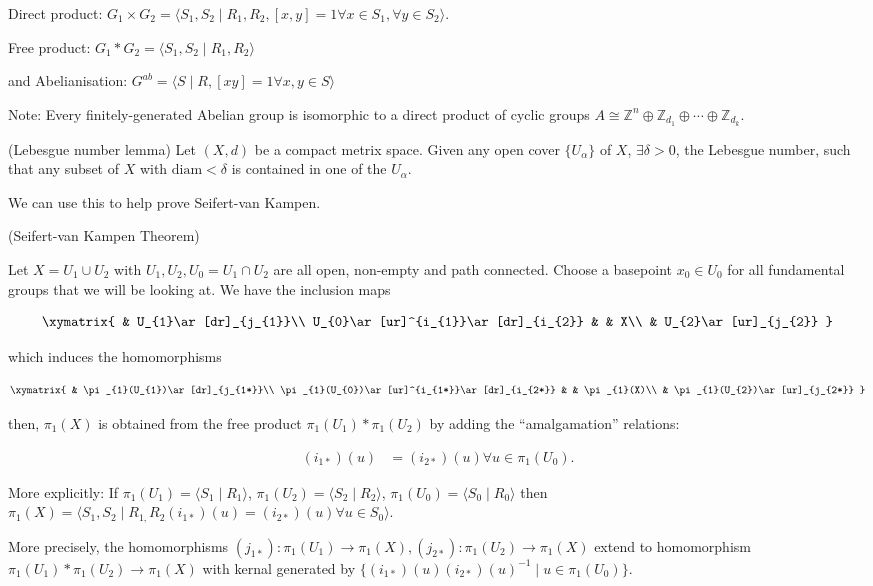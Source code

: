 Direct product: $G_{1}\times G_{2}=\langle S_{1},S_{2}\mid R_{1},R_{2},[x,y]=1\forall x\in S_{1},\forall y\in S_{2}\rangle.$

Free product: $G_{1}*G_{2}=\langle S_{1},S_{2}\mid R_{1},R_{2}\rangle$

and Abelianisation: $G^{ab}=\langle S\mid R,[xy]=1\forall x,y\in S\rangle$

Note: Every finitely-generated Abelian group is isomorphic to a direct
product of cyclic groups $A\cong\mathbb{Z}^{n}\oplus\mathbb{Z}_{d_{1}}\oplus\cdots\oplus\mathbb{Z}_{d_{k}}.$
\begin{lem}
(Lebesgue number lemma) Let $(X,d)$ be a compact metrix space. Given
any open cover $\{U_{\alpha}\}$ of $X$, $\exists\delta>0$, the
Lebesgue number, such that any subset of $X$ with $\text{diam}<\delta$
is contained in one of the $U_{\alpha}$.
\end{lem}
We can use this to help prove Seifert-van Kampen.
\begin{thm}
(Seifert-van Kampen Theorem)

Let $X=U_{1}\cup U_{2}$ with $U_{1},U_{2},U_{0}=U_{1}\cap U_{2}$
are all open, non-empty and path connected. Choose a basepoint $x_{0}\in U_{0}$
for all fundamental groups that we will be looking at. We have the
inclusion maps

\begin{align*}
\xymatrix{ & U_{1}\ar[dr]_{j_{1}}\\
U_{0}\ar[ur]^{i_{1}}\ar[dr]_{i_{2}} &  & X\\
 & U_{2}\ar[ur]_{j_{2}}
}
\end{align*}


which induces the homomorphisms

\begin{align*}
\xymatrix{ & \pi_{1}(U_{1})\ar[dr]_{j_{1*}}\\
\pi_{1}(U_{0})\ar[ur]^{i_{1*}}\ar[dr]_{i_{2*}} &  & \pi_{1}(X)\\
 & \pi_{1}(U_{2})\ar[ur]_{j_{2*}}
}
\end{align*}


then, $\pi_{1}(X)$ is obtained from the free product $\pi_{1}(U_{1})*\pi_{1}(U_{2})$
by adding the ``amalgamation'' relations:

\begin{align*}
(i_{1*})(u) & =(i_{2*})(u)\forall u\in\pi_{1}(U_{0}).
\end{align*}


More explicitly: If $\pi_{1}(U_{1})=\langle S_{1}\mid R_{1}\rangle$,
$\pi_{1}(U_{2})=\langle S_{2}\mid R_{2}\rangle$, $\pi_{1}(U_{0})=\langle S_{0}\mid R_{0}\rangle$
then $\pi_{1}(X)=\langle S_{1},S_{2}\mid R_{1,}R_{2}(i_{1*})(u)=(i_{2*})(u)\forall u\in S_{0}\rangle$.

More precisely, the homomorphisms $(j_{1*}):\pi_{1}(U_{1})\to\pi_{1}(X),(j_{2*}):\pi_{1}(U_{2})\to\pi_{1}(X)$
extend to homomorphism $\pi_{1}(U_{1})*\pi_{1}(U_{2})\to\pi_{1}(X)$
with kernal generated by $\{(i_{1*})(u)(i_{2*})(u)^{-1}\mid u\in\pi_{1}(U_{0})\}$.
\end{thm}

